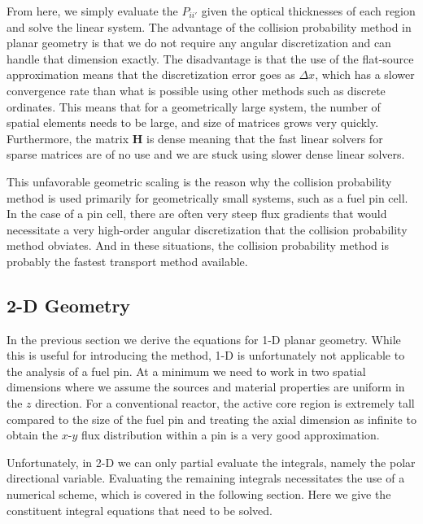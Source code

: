 From here, we simply evaluate the $P_{ii'}$ given the optical thicknesses of each region and solve the linear system. The advantage of the collision probability method in planar geometry is that we do not require any angular discretization and can handle that dimension exactly. The disadvantage is that the use of the flat-source approximation means that the discretization error goes as $\Delta x$, which has a slower convergence rate than what is possible using other methods such as discrete ordinates. This means that for a geometrically large system, the number of spatial elements needs to be large, and size of matrices grows very quickly. Furthermore, the matrix $\mathbf{H}$ is dense meaning that the fast linear solvers for sparse matrices are of no use and we are stuck using slower dense linear solvers. 

This unfavorable geometric scaling is the reason why the collision probability method is used primarily for geometrically small systems, such as a fuel pin cell. In the case of a pin cell, there are often very steep flux gradients that would necessitate a very high-order angular discretization that the collision probability method obviates. And in these situations, the collision probability method is probably the fastest transport method available.





\subsection{2-D Geometry}

In the previous section we derive the equations for 1-D planar geometry. While this is useful for introducing the method, 1-D is unfortunately not applicable to the analysis of a fuel pin. At a minimum we need to work in two spatial dimensions where we assume the sources and material properties are uniform in the $z$ direction. For a conventional reactor, the active core region is extremely tall compared to the size of the fuel pin and treating the axial dimension as infinite to obtain the $x$-$y$ flux distribution within a pin is a very good approximation. 

Unfortunately, in 2-D we can only partial evaluate the integrals, namely the polar directional variable. Evaluating the remaining integrals necessitates the use of a numerical scheme, which is covered in the following section. Here we give the constituent integral equations that need to be solved.

